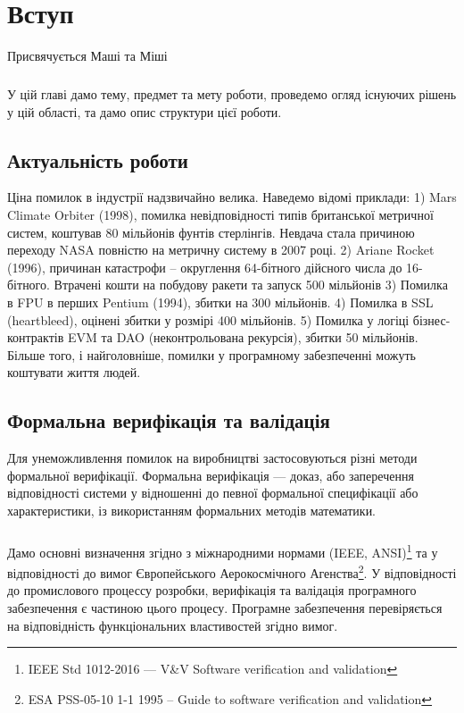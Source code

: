 \chapter{Вступ}

\epigraph{Присвячується Маші та Міші}{}

\paragraph{}
У цій главі дамо тему, предмет та мету роботи,
проведемо огляд існуючих рішень у цій області,
та дамо опис структури цієї роботи.

\section{Актуальність роботи}
Ціна помилок в індустрії надзвичайно велика. Наведемо
відомі приклади: 1) Mars Climate Orbiter (1998), помилка невідповідності
типів британської метричної систем, коштував 80 мільйонів фунтів стерлінгів.
Невдача стала причиною переходу NASA повністю на метричну систему в 2007 році.
2) Ariane Rocket (1996), причинан катастрофи -- округлення 64-бітного дійсного
числа до 16-бітного. Втрачені кошти на побудову ракети та запуск 500 мільйонів
3) Помилка в FPU в перших Pentium (1994), збитки на 300 мільйонів.
4) Помилка в SSL (heartbleed), оцінені збитки у розмірі 400 мільйонів.
5) Помилка у логіці бізнес-контрактів EVM та
DAO (неконтрольована рекурсія), збитки 50 мільйонів.
Більше того, і найголовніше, помилки у програмному забезпеченні можуть
коштувати життя людей.

\section{Формальна верифікація та валідація}
Для унеможливлення помилок на виробництві застосовуються різні
методи формальної верифікації. Формальна верифікація — доказ, або заперечення
відповідності системи у відношенні до певної формальної специфікації або характеристики,
із використанням формальних методів математики.

\paragraph{}
Дамо основні визначення згідно з міжнародними нормами (IEEE, ANSI)\footnote{IEEE Std 1012-2016  --- V\&V Software verification and validation} та у відповідності до вимог
Європейського Аерокосмічного Агенства\footnote{ESA PSS-05-10 1-1 1995 -- Guide to software verification and validation}.
У відповідності до промислового процессу розробки, верифікація та валідація програмного
забезпечення є частиною цього процесу. Програмне забезпечення перевіряється на
відповідність функціональних властивостей згідно вимог.

